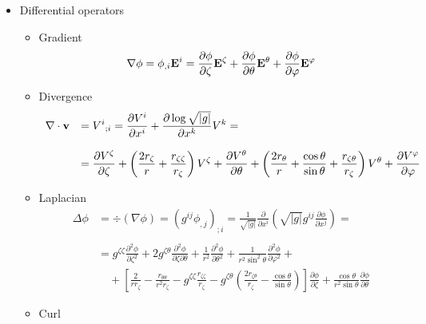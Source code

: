 \begin{itemize}
\begin{itemize}
\begin{equation}
\end{equation}
\end{itemize}
\item Differential operators
\begin{itemize}
\item Gradient
\begin{equation}
\nabla\phi=\phi_{,i}\mathbf{E}^i=\frac{\partial\phi}{\partial\zeta}\mathbf{E}^\zeta+
\frac{\partial\phi}{\partial\theta}\mathbf{E}^\theta+\frac{\partial\phi}{\partial\varphi}\mathbf{E}^\varphi
\end{equation}
\item Divergence
\begin{equation}
\begin{array}{rl}
\displaystyle\nabla\cdot\mathbf{v}&
\displaystyle ={V^i}_{;i}=
\frac{\partial V^i}{\partial x^i}+\frac{\partial\log\sqrt{|g|}}{\partial x^k}V^k=\\
\\
&\displaystyle =\frac{\partial V^\zeta}{\partial\zeta}+\left(\frac{2r_\zeta}{r}
+\frac{r_{\zeta\zeta}}{r_\zeta}
\right)V^\zeta+\frac{\partial V^\theta}{\partial\theta}+\left(\frac{2r_\theta}{r}+
\frac{\cos\theta}{\sin\theta}+\frac{r_{\zeta\theta}}{r_\zeta}\right)V^\theta+
\frac{\partial V^\varphi}{\partial\varphi}
\end{array}
\end{equation}
\item Laplacian
\begin{equation}
\begin{array}{rl}
\Delta\phi&
\displaystyle =\div(\nabla\phi)=(g^{ij}\phi_{,j})_{;i}=\frac{1}{\sqrt{|g|}}\frac{\partial}{\partial x^i}
\left(\sqrt{|g|}g^{ij}\frac{\partial\phi}{\partial x^j}\right)=\\
\\
&\displaystyle =
g^{\zeta\zeta}\frac{\partial^2\phi}{\partial\zeta^2}
+2g^{\zeta\theta}\frac{\partial^2\phi}{\partial\zeta\partial\theta}
+\frac{1}{r^2}\frac{\partial^2\phi}{\partial\theta^2}
+\frac{1}{r^2\sin^2\theta}\frac{\partial^2\phi}{\partial\varphi^2}
+\\
&\displaystyle\quad
+\left[\frac{2}{rr_\zeta}-\frac{r_{\theta\theta}}{r^2r_\zeta}
-g^{\zeta\zeta}\frac{r_{\zeta\zeta}}{r_\zeta}
-g^{\zeta\theta}\left(\frac{2r_{\zeta\theta}}{r_\zeta}-\frac{\cos\theta}{\sin\theta}\right)\right]
\frac{\partial\phi}{\partial\zeta}
+\frac{\cos\theta}{r^2\sin\theta}\frac{\partial\phi}{\partial\theta}
\end{array}
\end{equation}
\item Curl

\end{itemize}
\end{itemize}
